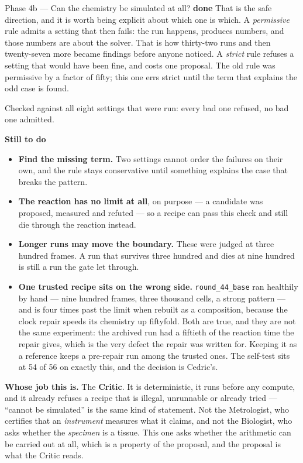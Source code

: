 \documentclass[11pt,a4paper]{article}
\newcommand{\code}[1]{\texttt{#1}}
\newcommand{\dn}{\textcolor{good}{\textbf{done}}}
\begin{document}
\begin{phasebox}{Phase 4b --- Can the chemistry be simulated at all? \hfill \dn}
That is the safe direction, and it is worth being explicit about which one is which. A
\emph{permissive} rule admits a setting that then fails: the run happens, produces numbers, and
those numbers are about the solver. That is how thirty-two runs and then twenty-seven more became
findings before anyone noticed. A \emph{strict} rule refuses a setting that would have been fine,
and costs one proposal. The old rule was permissive by a factor of fifty; this one errs strict
until the term that explains the odd case is found.

Checked against all eight settings that were run: every bad one refused, no bad one admitted.

\textbf{Still to do}
\begin{itemize}[itemsep=1pt]
\item \textbf{Find the missing term.} Two settings cannot order the failures on their own, and the
rule stays conservative until something explains the case that breaks the pattern.
\item \textbf{The reaction has no limit at all}, on purpose --- a candidate was proposed, measured
and refuted --- so a recipe can pass this check and still die through the reaction instead.
\item \textbf{Longer runs may move the boundary.} These were judged at three hundred frames. A run
that survives three hundred and dies at nine hundred is still a run the gate let through.
\item \textbf{One trusted recipe sits on the wrong side.} \code{round\_44\_base} ran healthily by
hand --- nine hundred frames, three thousand cells, a strong pattern --- and is four times past the
limit when rebuilt as a composition, because the clock repair speeds its chemistry up fiftyfold.
Both are true, and they are not the same experiment: the archived run had a fiftieth of the
reaction time the repair gives, which is the very defect the repair was written for. Keeping it as
a reference keeps a pre-repair run among the trusted ones. The self-test sits at 54 of 56 on
exactly this, and the decision is Cedric's.
\end{itemize}

\textbf{Whose job this is.} The \textbf{Critic}. It is deterministic, it runs before any compute,
and it already refuses a recipe that is illegal, unrunnable or already tried --- ``cannot be
simulated'' is the same kind of statement. Not the Metrologist, who certifies that an
\emph{instrument} measures what it claims, and not the Biologist, who asks whether the
\emph{specimen} is a tissue. This one asks whether the arithmetic can be carried out at all, which
is a property of the proposal, and the proposal is what the Critic reads.
\end{phasebox}
\end{document}

